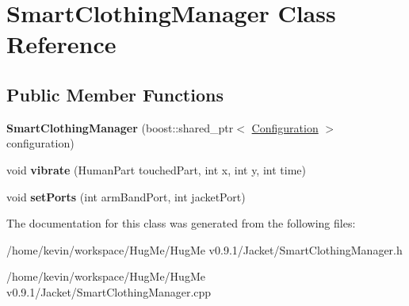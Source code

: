 \hypertarget{classSmartClothingManager}{
\section{SmartClothingManager Class Reference}
\label{classSmartClothingManager}
}
\subsection*{Public Member Functions}
\begin{DoxyCompactItemize}
\item 
\hypertarget{classSmartClothingManager_ab072728e81425927a693645f4025f299}{
{\bfseries SmartClothingManager} (boost::shared\_\-ptr$<$ \hyperlink{classConfiguration}{Configuration} $>$ configuration)}
\label{classSmartClothingManager_ab072728e81425927a693645f4025f299}

\item 
\hypertarget{classSmartClothingManager_a523c8a28beef2d207104624a0a9ca79f}{
void {\bfseries vibrate} (HumanPart touchedPart, int x, int y, int time)}
\label{classSmartClothingManager_a523c8a28beef2d207104624a0a9ca79f}

\item 
\hypertarget{classSmartClothingManager_ab6b5433716ef95d9cc631b784de33611}{
void {\bfseries setPorts} (int armBandPort, int jacketPort)}
\label{classSmartClothingManager_ab6b5433716ef95d9cc631b784de33611}

\end{DoxyCompactItemize}


The documentation for this class was generated from the following files:\begin{DoxyCompactItemize}
\item 
/home/kevin/workspace/HugMe/HugMe v0.9.1/Jacket/SmartClothingManager.h\item 
/home/kevin/workspace/HugMe/HugMe v0.9.1/Jacket/SmartClothingManager.cpp\end{DoxyCompactItemize}
